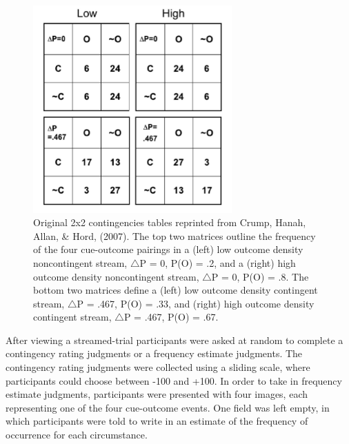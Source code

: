 \documentclass[
  english,
  man,floatsintext]{apa6}
\begin{document}
\begin{figure}

{\centering \includegraphics[width=3in]{imgs/crump_figure2_cropped} 

}

\caption{Original 2x2 contingencies tables reprinted from Crump, Hanah, Allan, \& Hord, (2007). The top two matrices outline the frequency of the four cue-outcome pairings in a (left) low outcome density noncontingent stream, $\triangle$P = 0, P(O) = .2, and a (right) high outcome density noncontingent stream, $\triangle$P = 0, P(O) = .8. The bottom two matrices define a (left) low outcome density contingent stream, $\triangle$P = .467, P(O) = .33, and (right) high outcome density contingent stream,  $\triangle$P = .467, P(O) = .67.}\label{fig:unnamed-chunk-1}
\end{figure}

After viewing a streamed-trial participants were asked at random to complete a contingency rating judgments or a frequency estimate judgments. The contingency rating judgments were collected using a sliding scale, where participants could choose between -100 and +100. In order to take in frequency estimate judgments, participants were presented with four images, each representing one of the four cue-outcome events. One field was left empty, in which participants were told to write in an estimate of the frequency of occurrence for each circumstance.
\end{document}
